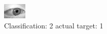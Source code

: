 \begin{figure}[h!]
\begin{center}
\includegraphics[width=0.60\columnwidth]{figures/ID2775_class_2_target_1.png}
\end{center}
\caption{ Classification: 2 actual target: 1}
\label{fig:ID2775_class_2_target_1}
\end{figure}
